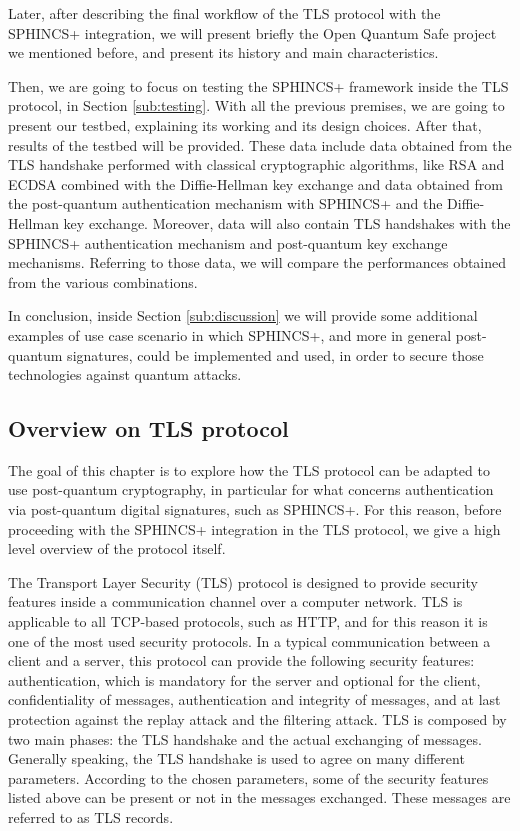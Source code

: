 \documentclass[a4paper,12pt]{article}
\begin{document}
Later, after describing the final workflow of the TLS protocol with the SPHINCS+ integration, we will present briefly the Open Quantum Safe project we mentioned before, and present its history and main characteristics. 

Then, we are going to focus on testing the SPHINCS+ framework inside the TLS protocol, in Section \ref{sub:testing}.
With all the previous premises, we are going to present our testbed, explaining its working and its design choices. After that, results of the testbed will be provided. These data include data obtained from the TLS handshake performed with classical cryptographic algorithms, like RSA and ECDSA combined with the Diffie-Hellman key exchange and data obtained from the post-quantum authentication mechanism with SPHINCS+ and the Diffie-Hellman key exchange. Moreover, data will also contain TLS handshakes with the SPHINCS+ authentication mechanism and post-quantum key exchange mechanisms.
Referring to those data, we will compare the performances obtained from the various combinations.

In conclusion, inside Section \ref{sub:discussion}
we will provide some additional examples of use case scenario in which SPHINCS+, and more in general post-quantum signatures, could be implemented and used, in order to secure those technologies against quantum attacks.

\subsection{Overview on TLS protocol}

The goal of this chapter is to explore how the TLS protocol can be adapted to use post-quantum cryptography, in particular for what concerns authentication via post-quantum digital signatures, such as SPHINCS+.
For this reason, before proceeding with the SPHINCS+ integration in the TLS protocol, we give a high level overview of the protocol itself.

The Transport Layer Security (TLS) protocol is designed to provide security features inside a communication channel over a computer network. TLS is applicable to all TCP-based protocols, such as HTTP, and for this reason it is one of the most used security protocols.
In a typical communication between a client and a server, this protocol can provide the following security features: authentication, which is mandatory for the server and optional for the client, confidentiality of messages, authentication and integrity of messages, and at last protection against the replay attack and the filtering attack.
TLS is composed by two main phases: the TLS handshake and the actual exchanging of messages. Generally speaking, the TLS handshake is used to agree on many different parameters. According to the chosen parameters, some of the security features listed above can be present or not in the messages exchanged. These messages are referred to as TLS records.
\end{document}
